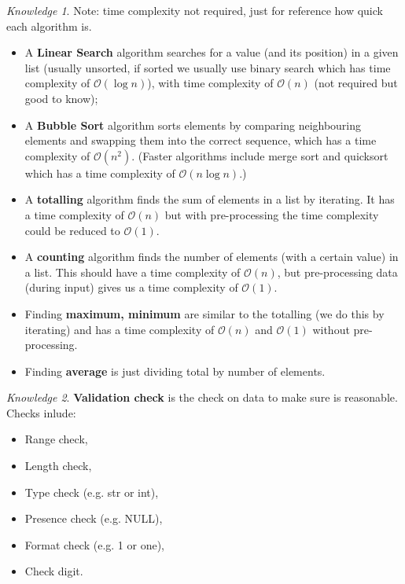 \documentclass[8pt]{article}
\theoremstyle{remark}
\newtheorem{knowledge}{Knowledge}[subsection]
\begin{document}
        \begin{knowledge}
            Note: time complexity not required, just for reference how quick each algorithm is.
            \begin{itemize}
                \item A \textbf{Linear Search} algorithm searches for a value (and its position) in a given list (usually unsorted, if sorted we usually use binary search which has time complexity of $\mathcal{O}(\log n)$), with time complexity of $\mathcal{O}(n)$ (not required but good to know);
                \item A \textbf{Bubble Sort} algorithm sorts elements by comparing neighbouring elements and swapping them into the correct sequence, which has a time complexity of $\mathcal{O}(n^2)$. (Faster algorithms include merge sort and quicksort which has a time complexity of $\mathcal{O}(n \log n)$.)
                \item A \textbf{totalling} algorithm finds the sum of elements in a list by iterating. It has a time complexity of $\mathcal{O}(n)$ but with pre-processing the time complexity could be reduced to $\mathcal{O}(1)$.
                \item A \textbf{counting} algorithm finds the number of elements (with a certain value) in a list. This should have a time complexity of $\mathcal{O}(n)$, but pre-processing data (during input) gives us a time complexity of $\mathcal{O}(1)$.
                \item Finding \textbf{maximum, minimum} are similar to the totalling (we do this by iterating) and has a time complexity of $\mathcal{O}(n)$ and $\mathcal{O}(1)$ without pre-processing.
                \item Finding \textbf{average} is just dividing total by number of elements.
            \end{itemize}
        \end{knowledge}

        \begin{knowledge}
            \textbf{Validation check} is the check on data to make sure is reasonable. Checks inlude:
            \begin{itemize}
                \item Range check,
                \item Length check,
                \item Type check (e.g. str or int),
                \item Presence check (e.g. NULL),
                \item Format check (e.g. 1 or one),
                \item Check digit.
            \end{itemize}
        \end{knowledge}
\end{document}
